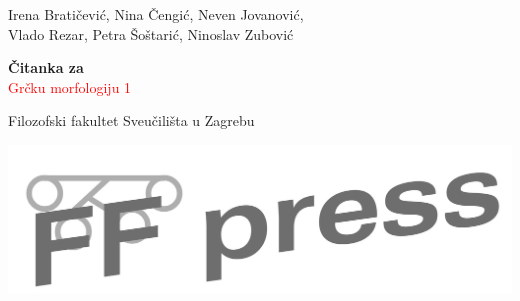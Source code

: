 \begin{titlepage} %

	\raggedleft %
	
	\vspace*{\baselineskip} %
	
	
	{\Large Irena Bratičević, Nina Čengić, Neven Jovanović,\\Vlado Rezar, Petra Šoštarić, Ninoslav Zubović} %
	
	\vspace*{0.167\textheight} %
	
	
	\textbf{\LARGE Čitanka za}\\[\baselineskip] %
	
	{\textcolor{Red}{\Huge Grčku morfologiju 1}}\\[\baselineskip] %
	
	
	\vfill %
	
	
	{\large Filozofski fakultet Sveučilišta u Zagrebu
	
	\medskip
	
\includegraphics[scale=0.20]{ffpress-cb.png}} %
	
	\vspace*{3\baselineskip} %

\end{titlepage}



